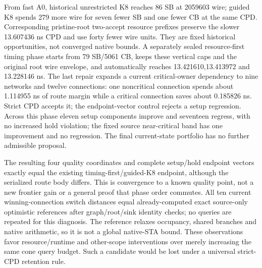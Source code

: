 \documentclass[conference,10pt]{IEEEtran}
\begin{document}
From fast A0, historical unrestricted K8 reaches 86 SB at 2059603 wire; guided K8 spends 279 more wire for seven fewer SB and one fewer CB at the same CPD. Corresponding pristine-root two-accept resource prefixes preserve the slower 13.607436 ns CPD and use forty fewer wire units. They are fixed historical opportunities, not converged native bounds. A separately sealed resource-first timing phase starts from 79 SB/5061 CB, keeps these vertical caps and the original root wire envelope, and automatically reaches 13.421610,13.413972 and 13.228146 ns. The last repair expands a current critical-owner dependency to nine networks and twelve connections: one noncritical connection spends about 1.114955 ns of route margin while a critical connection saves about 0.185826 ns. Strict CPD accepts it; the endpoint-vector control rejects a setup regression. Across this phase eleven setup components improve and seventeen regress, with no increased hold violation; the fixed source near-critical band has one improvement and no regression. The final current-state portfolio has no further admissible proposal.

The resulting four quality coordinates and complete setup/hold endpoint vectors exactly equal the existing timing-first/guided-K8 endpoint, although the serialized route body differs. This is convergence to a known quality point, not a new frontier gain or a general proof that phase order commutes. All ten current winning-connection switch distances equal already-computed exact source-only optimistic references after graph/root/sink identity checks; no queries are repeated for this diagnosis. The reference relaxes occupancy, shared branches and native arithmetic, so it is not a global native-STA bound. These observations favor resource/runtime and other-scope interventions over merely increasing the same cone query budget. Such a candidate would be lost under a universal strict-CPD retention rule.
\end{document}
